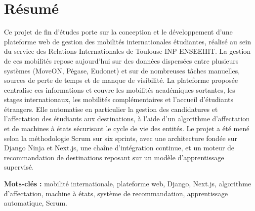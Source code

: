 \titlespacing*{\chapter}{0pt}{-55pt}{22pt}%

\chapter*{Résumé}
{}

\justifying
Ce projet de fin d'études porte sur la conception et le développement d'une
plateforme web de gestion des mobilités internationales étudiantes, réalisé au
sein du service des Relations Internationales de Toulouse INP-ENSEEIHT. La
gestion de ces mobilités repose aujourd'hui sur des données dispersées entre
plusieurs systèmes (MoveON, Pégase, Eudonet) et sur de nombreuses tâches
manuelles, sources de perte de temps et de manque de visibilité. La plateforme
proposée centralise ces informations et couvre les mobilités académiques
sortantes, les stages internationaux, les mobilités complémentaires et l'accueil
d'étudiants étrangers. Elle automatise en particulier la gestion des
candidatures et l'affectation des étudiants aux destinations, à l'aide d'un
algorithme d'affectation et de machines à états sécurisant le cycle de vie des
entités. Le projet a été mené selon la méthodologie Scrum sur six sprints, avec
une architecture fondée sur Django Ninja et Next.js, une chaîne d'intégration
continue, et un moteur de recommandation de destinations reposant sur un modèle
d'apprentissage supervisé.

\vspace{0.25cm}
\noindent\textbf{Mots-clés :} mobilité internationale, plateforme web, Django,
Next.js, algorithme d'affectation, machine à états, système de recommandation,
apprentissage automatique, Scrum.

\vspace{0.35cm}

